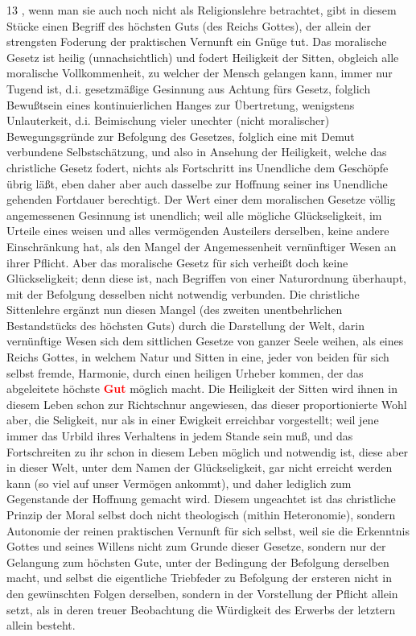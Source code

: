 \documentclass[a4paper,12pt,twoside]{book}
\newcommand{\match}[1]{\textcolor{red}{\textbf{#1}}}
\begin{document}
	
	13
	, wenn man sie auch noch nicht als Religionslehre betrachtet, gibt in diesem Stücke  einen Begriff des höchsten Guts (des Reichs Gottes), der allein der strengsten Foderung der praktischen Vernunft ein Gnüge tut. Das moralische Gesetz ist heilig (unnachsichtlich) und fodert Heiligkeit der Sitten, obgleich alle moralische Vollkommenheit, zu welcher der Mensch gelangen kann, immer nur Tugend ist, d.i. gesetzmäßige Gesinnung aus Achtung fürs Gesetz, folglich Bewußtsein eines kontinuierlichen Hanges zur Übertretung, wenigstens Unlauterkeit, d.i. Beimischung vieler unechter (nicht moralischer) Bewegungsgründe zur Befolgung des Gesetzes, folglich eine mit Demut verbundene Selbstschätzung, und also in Ansehung der Heiligkeit, welche das christliche Gesetz fodert, nichts als Fortschritt ins Unendliche dem Geschöpfe  übrig läßt, eben daher aber auch dasselbe zur Hoffnung seiner ins Unendliche gehenden Fortdauer berechtigt. Der Wert einer dem moralischen Gesetze völlig angemessenen Gesinnung ist unendlich; weil alle mögliche Glückseligkeit, im Urteile eines weisen und alles vermögenden Austeilers derselben, keine andere Einschränkung hat, als den Mangel der Angemessenheit vernünftiger Wesen an ihrer Pflicht. Aber das moralische Gesetz für sich verheißt doch keine Glückseligkeit; denn diese ist, nach Begriffen von einer Naturordnung überhaupt, mit der Befolgung desselben nicht notwendig verbunden. Die christliche Sittenlehre ergänzt nun diesen Mangel (des zweiten unentbehrlichen Bestandstücks des höchsten Guts) durch die Darstellung der Welt, darin vernünftige Wesen sich dem sittlichen Gesetze von ganzer Seele weihen, als eines Reichs Gottes, in welchem Natur und Sitten in eine, jeder von beiden für sich selbst fremde, Harmonie, durch einen heiligen Urheber kommen, der das abgeleitete höchste \match{Gut} möglich macht. Die Heiligkeit der Sitten wird ihnen in diesem Leben schon zur Richtschnur angewiesen, das dieser proportionierte Wohl aber, die Seligkeit, nur als in einer Ewigkeit erreichbar vorgestellt; weil jene immer das Urbild ihres Verhaltens in jedem Stande sein muß, und das Fortschreiten zu ihr schon in diesem Leben möglich und notwendig ist, diese aber in dieser Welt, unter dem Namen der Glückseligkeit, gar nicht erreicht werden kann (so viel auf unser Vermögen ankommt), und daher lediglich zum Gegenstande der Hoffnung gemacht wird. Diesem ungeachtet ist das christliche Prinzip der Moral selbst doch nicht theologisch (mithin Heteronomie), sondern Autonomie der reinen praktischen Vernunft für sich selbst, weil sie die Erkenntnis Gottes und seines Willens nicht zum Grunde dieser Gesetze, sondern nur der Gelangung zum höchsten Gute, unter der Bedingung der Befolgung derselben macht, und selbst die eigentliche Triebfeder zu Befolgung der ersteren nicht in den gewünschten Folgen derselben, sondern in der Vorstellung der Pflicht allein setzt, als in deren treuer Beobachtung die Würdigkeit des Erwerbs der letztern allein besteht. 
	
\end{document}
